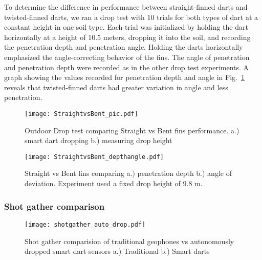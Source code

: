  To determine the difference in performance between straight-finned darts and twisted-finned darts, we ran a drop test with 10 trials for both types of dart at a constant height in one soil type. Each trial was initialized by holding the dart horizontally at a height of 10.5 meters, dropping it into the soil, and recording the penetration depth and penetration angle. Holding the darts horizontally emphasized the angle-correcting behavior of the fins. The angle of penetration and penetration depth were recorded as in the other drop test experiments. A graph showing the values recorded for penetration depth and angle in Fig.~\ref{fig:StraightBentPic} reveals that twisted-finned darts had greater variation in angle and less penetration.
\begin{figure} \centering
  {\texttt{[image: StraightvsBent\_pic.pdf]}}
 \caption{Outdoor Drop test comparing Straight vs Bent fins performance.
 a.)  smart dart dropping 
 b.)  measuring drop height} 
 \label{fig:StraightBentPic}
 \vspace{-1em}
\end{figure}
\begin{figure} \centering
  {\texttt{[image: StraightvsBent\_depthangle.pdf]}}
 \caption{\label{fig:StraightBentDepth}Straight vs Bent fins comparing a.) penetration depth b.) angle of deviation. Experiment used a fixed drop height of 9.8 m.} 
\end{figure}
\subsubsection{Shot gather comparison}

\begin{figure} \centering
  {\texttt{[image: shotgather\_auto\_drop.pdf]}}
 \caption{Shot gather comparision of traditional geophones vs autonomously dropped smart dart sensors a.) Traditional b.) Smart darts} 
 \label{fig:TradvsAutoDrop}
\end{figure}


 